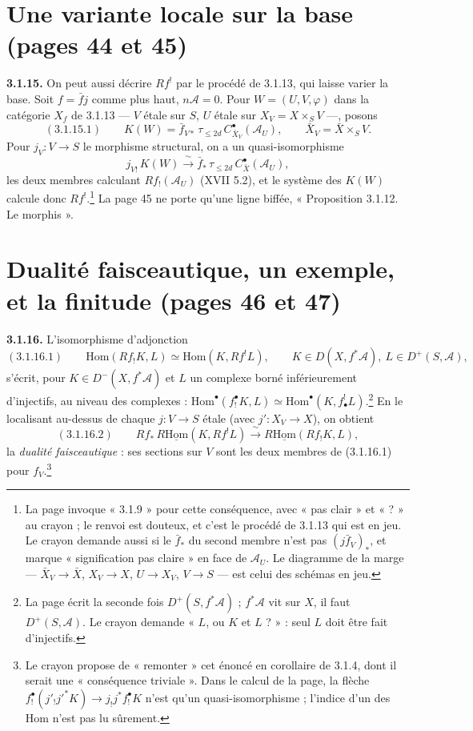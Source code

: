 \documentclass[11pt,a4paper]{article}
\begin{document}
\section*{Une variante locale sur la base (pages 44 et 45)}

\textbf{3.1.15.} On peut aussi décrire $Rf^!$ par le procédé de 3.1.13, qui
laisse varier la base. Soit $f = \bar f j$ comme plus haut, $n\mathcal{A} =
0$. Pour $W = (U, V, \varphi)$ dans la catégorie $X_f$ de 3.1.13 --- $V$ étale
sur $S$, $U$ étale sur $X_V = X \times_S V$ ---, posons
\[
(3.1.15.1)\qquad K(W) = \bar f_{V*}\,\tau_{\leqslant 2d}\,C^{\bullet}_{\bar
X_V}(\mathcal{A}_U), \qquad \bar X_V = \bar X \times_S V.
\]
Pour $j_V\colon V \to S$ le morphisme structural, on a un quasi-isomorphisme
\[
j_{V!}\,K(W) \xrightarrow{\ \sim\ } \bar f_*\,\tau_{\leqslant 2d}\,
C^{\bullet}_{\bar X}(\mathcal{A}_U),
\]
les deux membres calculant $Rf_!(\mathcal{A}_U)$ (XVII 5.2), et le système
des $K(W)$ calcule donc $Rf^!$.\footnote{La page invoque « 3.1.9 » pour cette
conséquence, avec « pas clair » et « ? » au crayon ; le renvoi est douteux, et
c'est le procédé de 3.1.13 qui est en jeu. Le crayon demande aussi si le
$\bar f_*$ du second membre n'est pas $(j\bar f_V)_*$, et marque « signification
pas claire » en face de $\mathcal{A}_U$. Le diagramme de la marge ---
$\bar X_V \to \bar X$, $X_V \to X$, $U \to X_V$, $V \to S$ --- est celui
des schémas en jeu.} La page 45 ne porte qu'une ligne biffée,
« Proposition 3.1.12. Le morphis ».

\section*{Dualité faisceautique, un exemple, et la finitude (pages 46 et 47)}

\textbf{3.1.16.} L'isomorphisme d'adjonction
\[
(3.1.16.1)\qquad \mathrm{Hom}(Rf_!K, L) \simeq \mathrm{Hom}(K, Rf^!L),
\qquad K \in D(X, f^*\mathcal{A}),\ L \in D^+(S, \mathcal{A}),
\]
s'écrit, pour $K \in D^-(X, f^*\mathcal{A})$ et $L$ un complexe borné
inférieurement d'injectifs, au niveau des complexes :
$\mathrm{Hom}^{\bullet}(f_!^{\bullet}K, L) \simeq \mathrm{Hom}^{\bullet}(K,
f^!_{\bullet}L)$.\footnote{La page écrit la seconde fois $D^+(S,
f^*\mathcal{A})$ ; $f^*\mathcal{A}$ vit sur $X$, il faut $D^+(S,
\mathcal{A})$. Le crayon demande « $L$, ou $K$ et $L$ ? » : seul $L$ doit
être fait d'injectifs.} En le localisant au-dessus de chaque $j\colon V \to
S$ étale (avec $j'\colon X_V \to X$), on obtient
\[
(3.1.16.2)\qquad Rf_*\,R\underline{\mathrm{Hom}}(K, Rf^!L)
\xrightarrow{\ \sim\ } R\underline{\mathrm{Hom}}(Rf_!K, L),
\]
la \emph{dualité faisceautique} : ses sections sur $V$ sont les deux membres
de (3.1.16.1) pour $f_V$.\footnote{Le crayon propose de « remonter » cet
énoncé en corollaire de 3.1.4, dont il serait une « conséquence triviale ».
Dans le calcul de la page, la flèche $f_!^{\bullet}(j'_!j'^*K) \to
j_!j^*f_!^{\bullet}K$ n'est qu'un quasi-isomorphisme ; l'indice d'un des
$\mathrm{Hom}$ n'est pas lu sûrement.}
\end{document}
